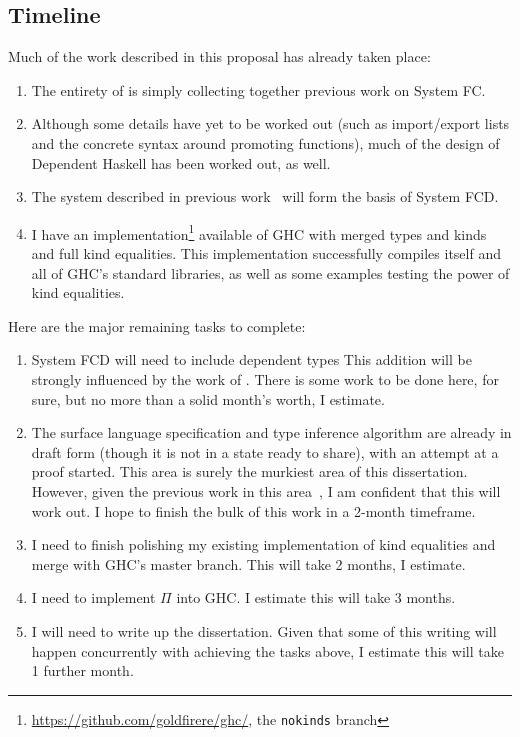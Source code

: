 \begin{proposal}

\chapter{\color{proposal}Timeline}

Much of the work described in this proposal has already taken place:
\begin{enumerate}
\item The entirety of  is simply collecting together previous
work on System FC.
\item Although some details have yet to be worked out (such as import/export lists
and the concrete syntax around promoting functions), much of the design of
Dependent Haskell has been worked out, as well.
\item The system described in previous work~\cite{nokinds} will form the
basis of System FCD.
\item I have an implementation\footnote{\url{https://github.com/goldfirere/ghc/},
the \texttt{nokinds} branch} available of GHC with merged types and kinds and
full kind equalities. This implementation successfully compiles itself and all
of GHC's standard libraries, as well as some examples testing the power of
kind equalities.
\end{enumerate}

Here are the major remaining tasks to complete:
\begin{enumerate}
\item System FCD will need to include dependent types
  This addition
  will be strongly influenced by the work of \citet{gundry-thesis}.
  There is some work to be done here, for sure, but no more than a solid
  month's worth, I estimate.
\item The surface language specification and type inference algorithm are
  already in draft form (though it is not in a state ready to share), with an
  attempt at a proof started. This area is surely the murkiest area of this
  dissertation. However, given the previous work in this area~\cite{gundry-thesis},
  I am confident that this will work out. I hope to finish the bulk of this work
  in a 2-month timeframe.
\item I need to finish polishing my existing implementation of kind equalities
  and merge with GHC's master branch. This will take 2 months, I estimate.
\item I need to implement $\Pi$ into GHC. I estimate this will take 3 months.
\item I will need to write up the dissertation. Given that some of this writing
  will happen concurrently with achieving the tasks above, I estimate this will
  take 1 further month.
\end{enumerate}


\end{proposal}
